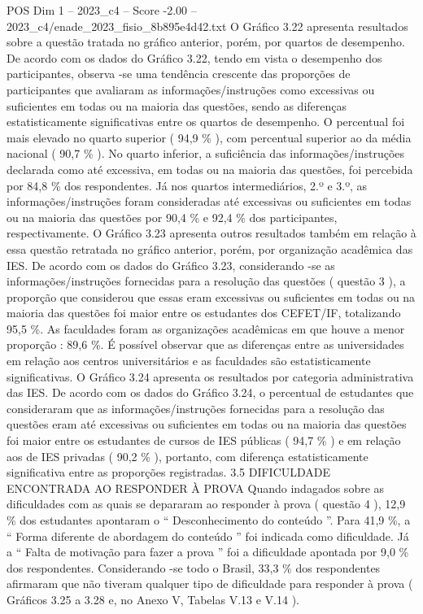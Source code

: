 \begin{textsample}{POS Dim 1 – 2023\_c4 – Score -2.00 – 2023\_c4/enade\_2023\_fisio\_8b895e4d42.txt}
O Gráfico 3.22 apresenta resultados sobre a questão tratada no gráfico anterior, porém, por quartos de desempenho.
De acordo com os dados do Gráfico 3.22, tendo em vista o desempenho dos participantes, observa -se uma tendência crescente das proporções de participantes que avaliaram as informações/instruções como excessivas ou suficientes em todas ou na maioria das questões, sendo as diferenças estatisticamente significativas entre os quartos de desempenho.
O percentual foi mais elevado no quarto superior ( 94,9 \% ), com percentual superior ao da média nacional ( 90,7 \% ).
No quarto inferior, a suficiência das informações/instruções declarada como até excessiva, em todas ou na maioria das questões, foi percebida por 84,8 \% dos respondentes.
Já nos quartos intermediários, 2.º e 3.º, as informações/instruções foram consideradas até excessivas ou suficientes em todas ou na maioria das questões por 90,4 \% e 92,4 \% dos participantes, respectivamente.
O Gráfico 3.23 apresenta outros resultados também em relação à essa questão retratada no gráfico anterior, porém, por organização acadêmica das IES.
De acordo com os dados do Gráfico 3.23, considerando -se as informações/instruções fornecidas para a resolução das questões ( questão 3 ), a proporção que considerou que essas eram excessivas ou suficientes em todas ou na maioria das questões foi maior entre os estudantes dos CEFET/IF, totalizando 95,5 \%.
As faculdades foram as organizações acadêmicas em que houve a menor proporção : 89,6 \%.
É possível observar que as diferenças entre as universidades em relação aos centros universitários e as faculdades são estatisticamente significativas.
O Gráfico 3.24 apresenta os resultados por categoria administrativa das IES.
De acordo com os dados do Gráfico 3.24, o percentual de estudantes que consideraram que as informações/instruções fornecidas para a resolução das questões eram até excessivas ou suficientes em todas ou na maioria das questões foi maior entre os estudantes de cursos de IES públicas ( 94,7 \% ) e em relação aos de IES privadas ( 90,2 \% ), portanto, com diferença estatisticamente significativa entre as proporções registradas. 3.5 DIFICULDADE ENCONTRADA AO RESPONDER À PROVA Quando indagados sobre as dificuldades com as quais se depararam ao responder à prova ( questão 4 ), 12,9 \% dos estudantes apontaram o “ Desconhecimento do conteúdo ”.
Para 41,9 \%, a “ Forma diferente de abordagem do conteúdo ” foi indicada como dificuldade.
Já a “ Falta de motivação para fazer a prova ” foi a dificuldade apontada por 9,0 \% dos respondentes.
Considerando -se todo o Brasil, 33,3 \% dos respondentes afirmaram que não tiveram qualquer tipo de dificuldade para responder à prova ( Gráficos 3.25 a 3.28 e, no Anexo V, Tabelas V.13 e V.14 ).

\end{textsample}
